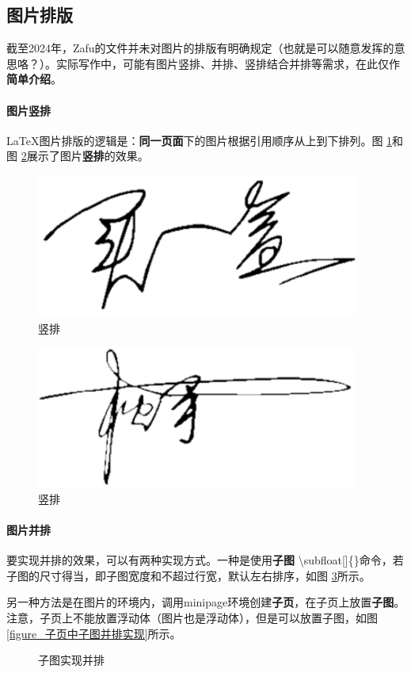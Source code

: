 \documentclass[AutoFakeBold]{ZafuThesis}
\begin{document}
\subsection{图片排版}
截至2024年，Zafu的文件并未对图片的排版有明确规定（也就是可以随意发挥的意思咯？）。实际写作中，可能有图片竖排、并排、竖排结合并排等需求，在此仅作\textbf{简单介绍}。
\paragraph{图片竖排}
\LaTeX 图片排版的逻辑是：\textbf{同一页面}下的图片根据引用顺序从上到下排列。图 \ref{figures_sp0}和图 \ref{figures_sp1}展示了图片\textbf{竖排}的效果。\par
\begin{figure}[htbp]
  \centering
  \includegraphics[width=0.24\columnwidth]{figures/MaiYihe}
  \caption{竖排}
  \label{figures_sp0}
\end{figure}
\begin{figure}[htbp]
  \centering
  \includegraphics[width=0.26\columnwidth]{figures/SongShou}
  \caption{竖排}
  \label{figures_sp1}
\end{figure}

\paragraph{图片并排}
要实现并排的效果，可以有两种实现方式。一种是使用\textbf{子图} \textbackslash subfloat[]\{\}命令，若子图的尺寸得当，即子图宽度和不超过行宽，默认左右排序，如图 \ref{figure_子图实现并排}所示。\par
另一种方法是在图片的环境内，调用minipage环境创建\textbf{子页}，在子页上放置\textbf{子图}。注意，子页上不能放置浮动体（图片也是浮动体），但是可以放置子图，如图 \ref{figure_子页中子图并排实现}所示。\par
\begin{figure}[htbp]
  \centering
  \hspace{1cm}
  \caption{子图实现并排}  
  \label{figure_子图实现并排}
\end{figure}
\end{document}
